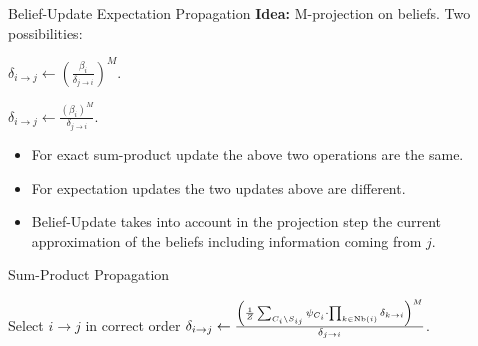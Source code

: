\begin{frame}{Belief-Update Expectation Propagation}
\textbf{Idea:} M-projection on beliefs. Two possibilities:
\begin{description}
    \pause \item[Sum-Product Propagation:] $\delta_{i \rightarrow j} \leftarrow \left( \frac{\beta_i}{\delta_{j \rightarrow i}} \right)^M$.
    \pause \item[Belief-Update Expectation Propagation:] $\delta_{i \rightarrow j} \leftarrow \frac{\left( \beta_i \right)^M}{\delta_{j \rightarrow i}}$.
\end{description}
\begin{itemize}
    \pause \item For exact sum-product update the above two operations are the same.
    \pause \item For expectation updates the two updates above are different.
    \pause \item Belief-Update takes into account in the projection step the current approximation of the beliefs including information coming from $j$. 
\end{itemize}
\pause
\begin{algorithm}[H]
   \caption{Sum-Product Propagation}
   \label{alg:calibration-sum-product-clique-tree}
    {
        Select $i \rightarrow j$ in correct order\;
        $\delta_{i \rightarrow j} \leftarrow \frac{\left(\frac{1}{Z} \sum_{C_i \setminus S_{ij}} \psi_{C_i} \cdot \prod_{k \in \text{Nb}(i)} \delta_{k \rightarrow i}\right)^M}{\delta_{j \rightarrow i}}$.
    }
\end{algorithm}
\end{frame}

